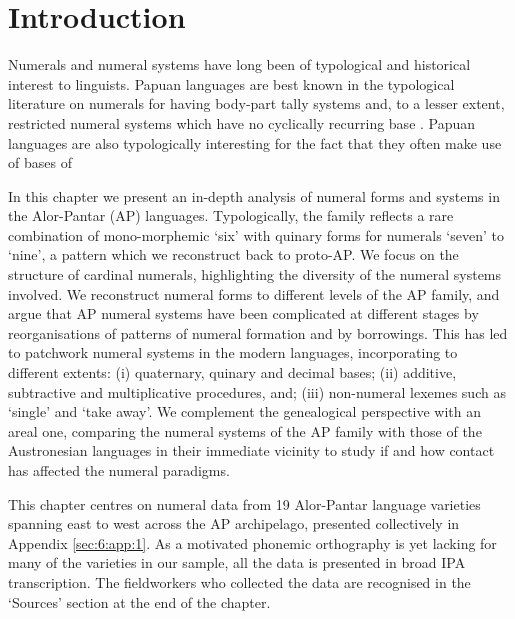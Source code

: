 
\renewcommand{\thesection}{\arabic{section}} 
 
\section{Introduction}

\hypertarget{Toc376958477}{}Numerals and numeral systems have long been of typological and historical interest to linguists. Papuan languages are best known in the typological literature on numerals for having body-part tally systems and, to a lesser extent, restricted numeral systems which have no cyclically recurring base{} \citep{Laycock1975,Lean1992,Comrie2005numsys}. Papuan languages are also typologically interesting for the fact that they often make use of bases of  

In this chapter we present an in-depth analysis of numeral forms and systems in the Alor-Pantar (AP) languages. Typologically, the family reflects a rare combination of mono-morphemic `six' with quinary forms for numerals `seven' to `nine', a pattern which we reconstruct back to proto-AP. We focus on the structure of cardinal numerals, highlighting the diversity of the numeral systems involved. We reconstruct numeral forms to different levels of the AP family, and argue that AP numeral systems have been complicated at different stages by reorganisations of patterns of numeral formation and by borrowings. This has led to patchwork numeral systems in the modern languages, incorporating to different extents: (i) quaternary, quinary and decimal bases; (ii) additive, subtractive and multiplicative procedures, and; (iii) non-numeral lexemes such as `single' and `take away'. We complement the genealogical perspective with an areal one, comparing the numeral systems of the AP family with those of the Austronesian languages in their immediate vicinity to study if and how contact has affected the numeral paradigms.

This chapter centres on numeral data from 19 Alor-Pantar language varieties spanning east to west across the AP archipelago, presented collectively in Appendix \ref{sec:6:app:1}. As a motivated phonemic orthography is yet lacking for many of the varieties in our sample, all the data is presented in broad IPA transcription. The fieldworkers who collected the data are recognised in the `Sources' section at the end of the chapter. 

